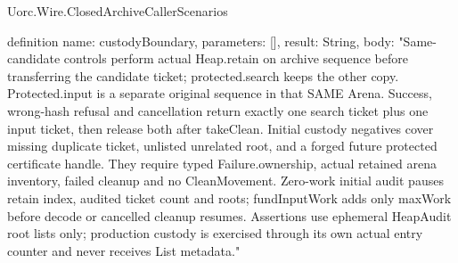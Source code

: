 \begin{lexlean}{Uorc.Wire.ClosedArchiveCallerScenarios}
\begin{semanticmodule}
definition{
  name: custodyBoundary,
  parameters: [],
  result: String,
  body: "Same-candidate controls perform actual Heap.retain on archive sequence before transferring the candidate ticket; protected.search keeps the other copy. Protected.input is a separate original sequence in that SAME Arena. Success, wrong-hash refusal and cancellation return exactly one search ticket plus one input ticket, then release both after takeClean. Initial custody negatives cover missing duplicate ticket, unlisted unrelated root, and a forged future protected certificate handle. They require typed Failure.ownership, actual retained arena inventory, failed cleanup and no CleanMovement. Zero-work initial audit pauses retain index, audited ticket count and roots; fundInputWork adds only maxWork before decode or cancelled cleanup resumes. Assertions use ephemeral HeapAudit root lists only; production custody is exercised through its own actual entry counter and never receives List metadata."
}
\end{semanticmodule}
\end{lexlean}
